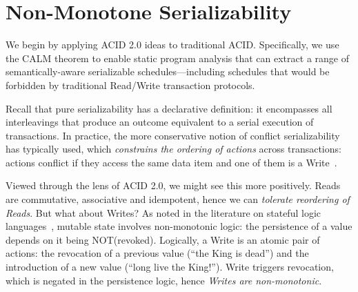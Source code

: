 \documentclass{sig-alternate}
\newcommand{\jmh}[1]{{\textcolor{red}{#1 -- jmh}}}
\newcommand{\paa}[1]{{\textcolor{blue}{[[#1 -- paa]]}}}
\begin{document}
\begin{comment}
At the risk of over-simplifying, ACID transactions are often thought of
as an \emph{inter-transaction} approach, realized by \emph{enforcing an order}
that satisfies serializability.  ACID 2.0 can be thought of as an
\emph{intra-transaction} approach that \emph{tolerates disorder} when
non-deterministic orders result in deterministic outcomes.  This is not a
precise characterization as we discuss below, but it is useful for framing
discussion.  \paa{I am not sure I get/buy the inter vs. intra dichotomy.  it
  seems to me that the transactional abstraction lets you write ordered programs
  and gives a guarantee of an *extension* of that order in a "correct" global
  schedule, whereas calm asks for unordered programs and in return gives correct
  executions.  *both* allow the programmer to not explicitly reason about
  inter-xact interleavings.} \jmh{Are you equating CALM with pure monotonicity?
  Because Bloom, with non-monotonicity, does not help reasoning transactionally.
  As I discuss below, pure monotonicity is trivially serializable, but that
  doesn't really help think about most transactions.}
\end{comment}

\section{Non-Monotone Serializability}
We begin by applying ACID 2.0 ideas to traditional ACID.  Specifically, we use the CALM theorem to enable static program analysis that can extract a range of semantically-aware serializable schedules---including schedules that would be forbidden by traditional Read/Write transaction protocols.

Recall that pure serializability has a declarative definition: it encompasses all interleavings
that produce an outcome equivalent to a serial execution of transactions.  In
practice, the more conservative notion of conflict serializability has typically
used, which \emph{constrains the ordering of actions} across transactions:
actions conflict if they access the same data item and one of them is a
Write~\cite{Eswaran1976}.  

Viewed through the lens of ACID 2.0, we might see this more positively.  Reads are commutative, associative and idempotent, hence we can \emph{tolerate reordering of Reads}.  But what about Writes? 
As noted in the literature on stateful logic languages~\cite{dedalus,statelog}, mutable state 
involves non-monotonic logic: the persistence of a value depends on it being
NOT(revoked). Logically, a Write is an atomic pair of actions: the revocation of a previous
value (``the King is dead'') and the introduction of a new value (``long live the King!''). 
Write triggers revocation, which is negated in the persistence logic, hence \emph{Writes are non-monotonic}.
\end{document}
